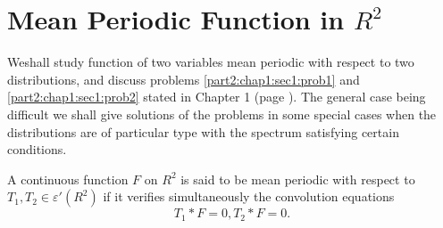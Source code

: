 
\chapter{Mean Periodic Function in $R^2$}\label{part2:chap2}%

We\pageoriginale shall study function of two variables mean periodic with respect to
two distributions, and discuss problems \ref{part2:chap1:sec1:prob1}
and \ref{part2:chap1:sec1:prob2} stated in Chapter 
1 (page \pageref{page68}). The general case being difficult we shall give
solutions of the problems in some special cases when the distributions
are of particular type with the spectrum satisfying certain
conditions. 

\begin{defi*}%
  A continuous function $F$ on $R^2$ is said to be mean periodic with
  respect to $T_1, T_2 \in \varepsilon'(R^2)$ if it verifies
  simultaneously the convolution equations 
  $$
  T_1 \ast F = 0, T_2 \ast F = 0.
  $$
\end{defi*}

